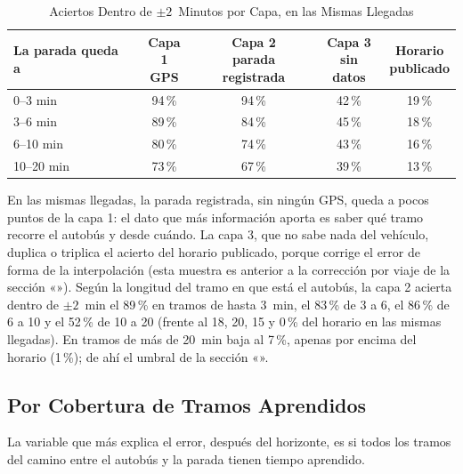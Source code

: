\begin{table}[ht]
\centering
\caption{Aciertos Dentro de $\pm2$~Minutos por Capa, en las Mismas Llegadas}\label{tab:capas}
\begin{tabular}{@{}lcccc@{}}
\toprule
La parada queda a & \shortstack{Capa 1\\GPS} & \shortstack{Capa 2\\parada registrada} & \shortstack{Capa 3\\sin datos} & \shortstack{Horario\\publicado}\\
\midrule
0--3 min   & 94\,\% & 94\,\% & 42\,\% & 19\,\%\\
3--6 min   & 89\,\% & 84\,\% & 45\,\% & 18\,\%\\
6--10 min  & 80\,\% & 74\,\% & 43\,\% & 16\,\%\\
10--20 min & 73\,\% & 67\,\% & 39\,\% & 13\,\%\\
\bottomrule
\end{tabular}
\end{table}

En las mismas llegadas, la parada registrada, sin ningún GPS, queda a pocos puntos de la capa 1: el dato que más información aporta es saber
qué tramo recorre el autobús y desde cuándo. La capa 3, que no sabe nada del vehículo, duplica o triplica el acierto
del horario publicado, porque corrige el error de forma de la interpolación (esta muestra es anterior a la corrección
por viaje de la sección «»). Según la longitud del tramo en que está el
autobús, la capa 2 acierta dentro de $\pm2$~min el 89\,\% en tramos de hasta 3~min, el 83\,\% de 3 a 6, el 86\,\% de 6
a 10 y el 52\,\% de 10 a 20 (frente al 18, 20, 15 y 0\,\% del horario en las mismas llegadas). En tramos de más de
20~min baja al 7\,\%, apenas por encima del horario (1\,\%); de ahí el umbral de la sección «».

\subsection{Por Cobertura de Tramos Aprendidos}
\label{sec:cobertura-tramos}

La variable que más explica el error, después del horizonte, es si todos los tramos del camino entre el autobús y la
parada tienen tiempo aprendido.

